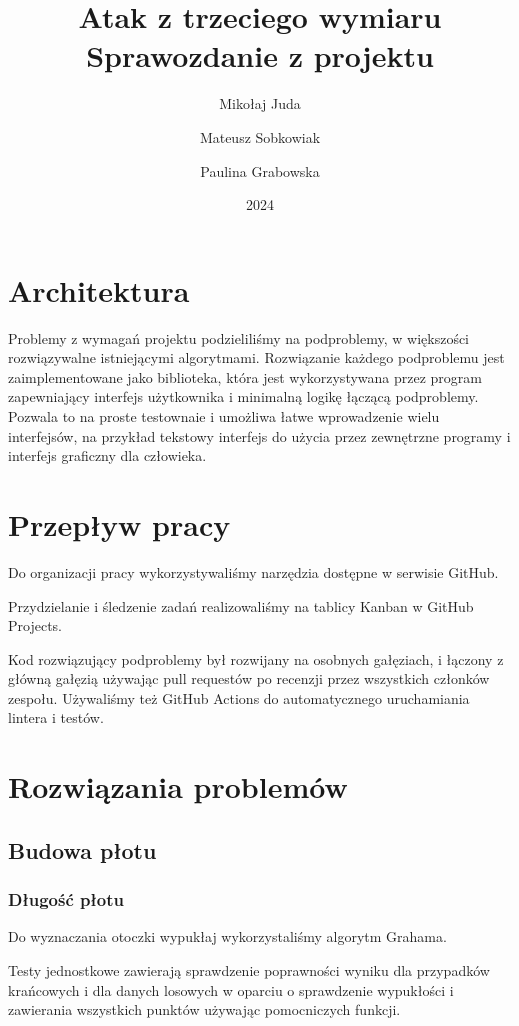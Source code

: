 \documentclass{article}
\title{Atak z trzeciego wymiaru \\\large Sprawozdanie z projektu}
\author{Mikołaj Juda \and Mateusz Sobkowiak \and Paulina Grabowska}
\date{2024}
\begin{document}
\maketitle

\section{Architektura}
Problemy z wymagań projektu podzieliliśmy na podproblemy, w większości
rozwiązywalne istniejącymi algorytmami.
Rozwiązanie każdego podproblemu jest zaimplementowane jako biblioteka,
która jest wykorzystywana przez program zapewniający interfejs użytkownika
i minimalną logikę łączącą podproblemy. Pozwala to na proste testownaie
i umożliwa łatwe wprowadzenie wielu interfejsów, na przykład
tekstowy interfejs do użycia przez zewnętrzne programy i interfejs graficzny dla człowieka.

\section{Przepływ pracy}
Do organizacji pracy wykorzystywaliśmy narzędzia dostępne w serwisie GitHub.

\noindent Przydzielanie i śledzenie zadań realizowaliśmy na tablicy Kanban w GitHub Projects.

\noindent Kod rozwiązujący podproblemy był rozwijany na osobnych gałęziach,
i łączony z główną gałęzią używając pull requestów po recenzji przez wszystkich członków zespołu.
Używaliśmy też GitHub Actions do automatycznego uruchamiania lintera i testów.

\section{Rozwiązania problemów}

\subsection{Budowa płotu}

\subsubsection{Długość płotu}
Do wyznaczania otoczki wypukłaj wykorzystaliśmy algorytm Grahama.

\noindent Testy jednostkowe zawierają sprawdzenie poprawności wyniku dla przypadków krańcowych
i dla danych losowych w oparciu o sprawdzenie wypukłości i zawierania wszystkich punktów
używając pomocniczych funkcji.
\end{document}
